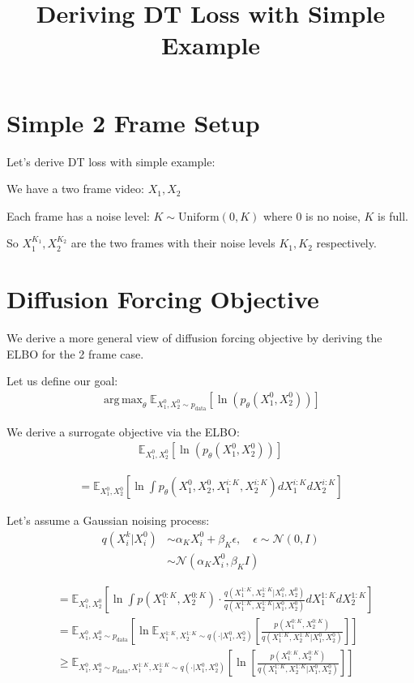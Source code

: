 \documentclass[11pt]{article}
\title{Deriving DT Loss with Simple Example}
\author{}
\date{}
\DeclareMathOperator*{\argmax}{arg\,max}
\begin{document}
\maketitle

\section{Simple 2 Frame Setup}
Let's derive DT loss with simple example:

We have a two frame video: $X_1, X_2$

Each frame has a noise level:
$K \sim \text{Uniform}(0, K)$ where 0 is no noise, $K$ is full.

So $X_1^{K_1}, X_2^{K_2}$ are the two frames with their noise levels $K_1, K_2$ respectively.

\section{Diffusion Forcing Objective}
We derive a more general view of diffusion forcing objective by deriving the ELBO for the 2 frame case.

Let us define our goal:
\begin{align}
\argmax_\theta \mathbb{E}_{X_1^0, X_2^0 \sim p_{\text{data}}} \left[ \ln(p_\theta(X_1^0, X_2^0)) \right]
\end{align}

We derive a surrogate objective via the ELBO:
\begin{align}
\mathbb{E}_{X_1^0, X_2^0} \left[ \ln(p_\theta(X_1^0, X_2^0)) \right]
\end{align}

\begin{align}
= \mathbb{E}_{X_1^0, X_2^0} \left[ \ln \int p_\theta(X_1^0, X_2^0, X_1^{i:K}, X_2^{i:K}) dX_1^{i:K} dX_2^{i:K} \right]
\end{align}

Let's assume a Gaussian noising process:
\begin{align}
q(X_i^k | X_i^0) &\sim \alpha_K X_i^0 + \beta_K \epsilon, \quad \epsilon \sim \mathcal{N}(0, I) \\
&\sim \mathcal{N}(\alpha_K X_i^0, \beta_K I)
\end{align}

\begin{align}
&= \mathbb{E}_{X_1^0, X_2^0} \left[ \ln \int p(X_1^{0:K}, X_2^{0:K}) \cdot \frac{q(X_1^{1:K}, X_2^{1:K} | X_1^0, X_2^0)}{q(X_1^{1:K}, X_2^{1:K} | X_1^0, X_2^0)} dX_1^{1:K} dX_2^{1:K} \right] \\
&= \mathbb{E}_{X_1^0, X_2^0 \sim p_{\text{data}}} \left[ \ln \mathbb{E}_{X_1^{1:K}, X_2^{1:K} \sim q(\cdot | X_1^0, X_2^0)} \left[ \frac{p(X_1^{0:K}, X_2^{0:K})}{q(X_1^{1:K}, X_2^{1:K} | X_1^0, X_2^0)} \right] \right] \\
&\geq \mathbb{E}_{X_1^0, X_2^0 \sim p_{\text{data}}, X_1^{1:K}, X_2^{1:K} \sim q(\cdot | X_1^0, X_2^0)} \left[ \ln \left[ \frac{p(X_1^{0:K}, X_2^{0:K})}{q(X_1^{1:K}, X_2^{1:K} | X_1^0, X_2^0)} \right] \right]
\end{align}
\end{document}
